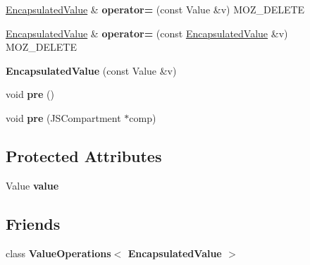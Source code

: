 \begin{DoxyCompactItemize}
\item 
\hypertarget{classjs_1_1_encapsulated_value_a4b7376e874041ab87339ed1ed7c52126}{\hyperlink{classjs_1_1_encapsulated_value}{Encapsulated\-Value} \& {\bfseries operator=} (const Value \&v) M\-O\-Z\-\_\-\-D\-E\-L\-E\-T\-E}\label{classjs_1_1_encapsulated_value_a4b7376e874041ab87339ed1ed7c52126}

\item 
\hypertarget{classjs_1_1_encapsulated_value_acb0eab8079d708792521c6b564ab7dab}{\hyperlink{classjs_1_1_encapsulated_value}{Encapsulated\-Value} \& {\bfseries operator=} (const \hyperlink{classjs_1_1_encapsulated_value}{Encapsulated\-Value} \&v) M\-O\-Z\-\_\-\-D\-E\-L\-E\-T\-E}\label{classjs_1_1_encapsulated_value_acb0eab8079d708792521c6b564ab7dab}

\item 
\hypertarget{classjs_1_1_encapsulated_value_a1b38414cd00088187268e7c3852e401f}{{\bfseries Encapsulated\-Value} (const Value \&v)}\label{classjs_1_1_encapsulated_value_a1b38414cd00088187268e7c3852e401f}

\item 
\hypertarget{classjs_1_1_encapsulated_value_a4180bd14d0ee72c14b2d7a3f06974f1d}{void {\bfseries pre} ()}\label{classjs_1_1_encapsulated_value_a4180bd14d0ee72c14b2d7a3f06974f1d}

\item 
\hypertarget{classjs_1_1_encapsulated_value_af8647cc264fc48c2cbcbff013b556cfa}{void {\bfseries pre} (J\-S\-Compartment $\ast$comp)}\label{classjs_1_1_encapsulated_value_af8647cc264fc48c2cbcbff013b556cfa}

\end{DoxyCompactItemize}
\subsection*{Protected Attributes}
\begin{DoxyCompactItemize}
\item 
\hypertarget{classjs_1_1_encapsulated_value_a1d51b0ab6d9174ca66d55fb71c860ba8}{Value {\bfseries value}}\label{classjs_1_1_encapsulated_value_a1d51b0ab6d9174ca66d55fb71c860ba8}

\end{DoxyCompactItemize}
\subsection*{Friends}
\begin{DoxyCompactItemize}
\item 
\hypertarget{classjs_1_1_encapsulated_value_add6106c44b1030485bd423fbedb80bbe}{class {\bfseries Value\-Operations$<$ Encapsulated\-Value $>$}}\label{classjs_1_1_encapsulated_value_add6106c44b1030485bd423fbedb80bbe}

\end{DoxyCompactItemize}


